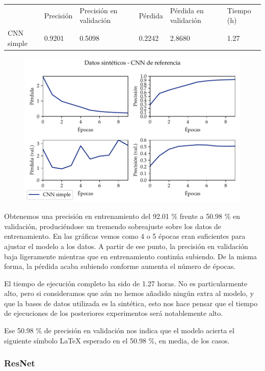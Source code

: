 \documentclass[a4paper, 20pt, dvipsnames]{article}
\begin{document}
\begin{table}[H]
	\centering
	\begin{tabular}{llllll}
		& Precisión & Precisión en validación & Pérdida & Pérdida en validación & Tiempo (h) \\ \cline{2-6} 
		CNN simple & 0.9201    & 0.5098                  & 0.2242  & 2.8680                & 1.27      
	\end{tabular}
\end{table}

\begin{figure}[H]
	\centering
	\includegraphics{fig/toy-1.pdf}
\end{figure}

Obtenemos una precisión en entrenamiento del 92.01 \% frente a 50.98 \% en
validación, produciéndose un tremendo sobreajuste sobre los datos de
entrenamiento. En las gráficas vemos como 4 o 5 épocas eran suficientes para
ajustar el modelo a los datos. A partir de ese punto, la precisión en validación
baja ligeramente mientras que en entrenamiento continúa subiendo. De la misma
forma, la pérdida acaba subiendo conforme aumenta el número de épocas.

El tiempo de ejecución completo ha sido de 1.27 horas. No es particularmente
alto, pero si consideramos que aún no hemos añadido ningún extra al modelo, y
que la bases de datos utilizada es la sintética, esto nos hace pensar que el
tiempo de ejecuciones de los posteriores experimentos será notablemente alto.

Ese 50.98 \% de precisión en validación nos indica que el modelo acierta el
siguiente símbolo \LaTeX{} esperado en el 50.98 \%, en media, de los casos.


\subsubsection{ResNet}
\label{exp:toy2}
\end{document}
